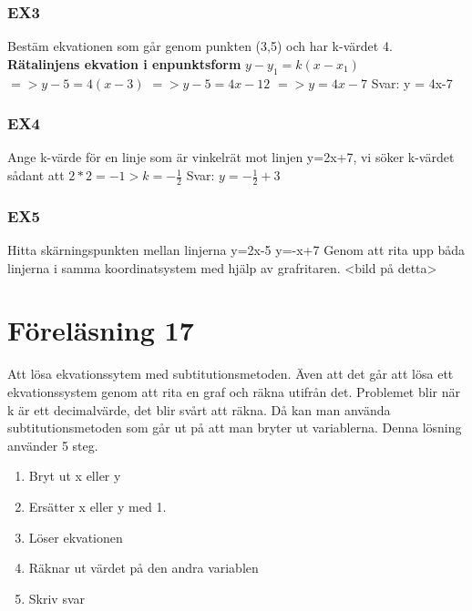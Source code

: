 \documentclass[a4paper,10pt]{article}
\begin{document}
\begin{flushleft}
\subsubsection{EX3}
Bestäm ekvationen som går genom punkten (3,5) och har k-värdet 4.\newline
\textbf{Rätalinjens ekvation i enpunktsform}\newline
$y - y_1 = k(x-x_1)$ \newline
$=> y-5 = 4(x-3)$ \newline
$=> y-5 = 4x-12 $ \newline
$=> y=4x-7$
Svar: y = 4x-7

\subsubsection{EX4}
Ange k-värde för en linje som är vinkelrät mot linjen y=2x+7, vi söker k-värdet sådant att $2*2=-1 > k = -\frac{1}{2}$ \newline
Svar: $y = -\frac{1}{2} + 3$

\subsubsection{EX5}
Hitta skärningspunkten mellan linjerna
y=2x-5\newline
y=-x+7\newline
Genom att rita upp båda linjerna i samma koordinatsystem med hjälp av grafritaren. \newline
<bild på detta>\newline

\section{Föreläsning 17}
Att lösa ekvationssytem med subtitutionsmetoden.\newline
Även att det går att lösa ett ekvationssystem genom att rita en graf och räkna utifrån det. Problemet blir när k är ett decimalvärde, det blir svårt att räkna.
Då kan man använda subtitutionsmetoden som går ut på att man bryter ut variablerna. Denna lösning använder 5 steg.
\begin{enumerate}
  \item Bryt ut x eller y
  \item Ersätter x eller y med 1.
  \item Löser ekvationen
  \item Räknar ut värdet på den andra variablen
  \item Skriv svar
\end{enumerate}

\end{flushleft}
\end{document}
